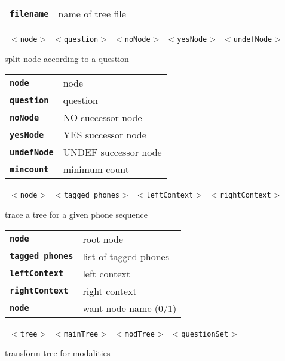\begin{description}
\begin{description}
      \begin{tabular}{ll}
 \texttt{\textbf{filename}} &  name of tree file  \\
      \end{tabular}
       \texttt{ $<$node$>$ $<$question$>$ $<$noNode$>$ $<$yesNode$>$ $<$undefNode$>$ } \

        split node according to a question

      \begin{tabular}{ll}
 \texttt{\textbf{node}} &       node \\
 \texttt{\textbf{question}} &   question  \\
 \texttt{\textbf{noNode}} &     NO    successor node  \\
 \texttt{\textbf{yesNode}} &    YES   successor node  \\
 \texttt{\textbf{undefNode}} &  UNDEF successor node  \\
 \texttt{\textbf{mincount}} &    minimum count  \\
      \end{tabular}
       \texttt{ $<$node$>$ $<$tagged phones$>$ $<$leftContext$>$ $<$rightContext$>$ } \

        trace a tree for a given phone sequence

      \begin{tabular}{ll}
 \texttt{\textbf{node}} &           root node \\
 \texttt{\textbf{tagged phones}} &  list of tagged phones \\
 \texttt{\textbf{leftContext}} &    left  context  \\
 \texttt{\textbf{rightContext}} &   right context  \\
 \texttt{\textbf{node}} &            want node name (0/1)  \\
      \end{tabular}
       \texttt{ $<$tree$>$ $<$mainTree$>$ $<$modTree$>$ $<$questionSet$>$   } \

        transform tree for modalities


\end{description}
\end{description}
